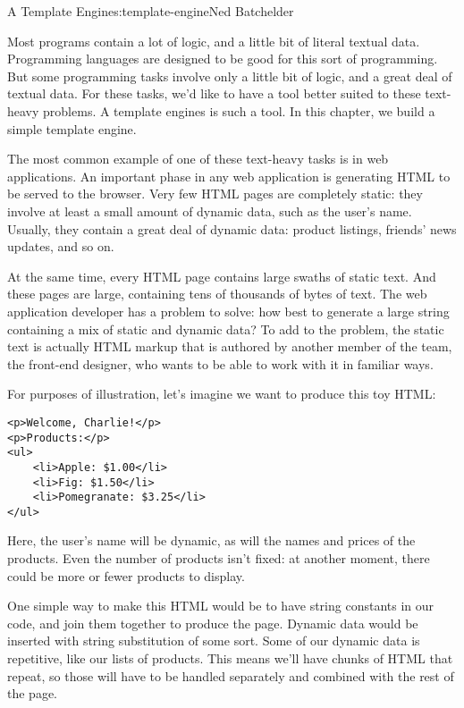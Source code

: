 \begin{aosachapter}{A Template Engine}{s:template-engine}{Ned Batchelder}

Most programs contain a lot of logic, and a little bit of literal
textual data. Programming languages are designed to be good for this
sort of programming. But some programming tasks involve only a little
bit of logic, and a great deal of textual data. For these tasks, we'd
like to have a tool better suited to these text-heavy problems. A
template engines is such a tool. In this chapter, we build a simple
template engine.

The most common example of one of these text-heavy tasks is in web
applications. An important phase in any web application is generating
HTML to be served to the browser. Very few HTML pages are completely
static: they involve at least a small amount of dynamic data, such as
the user's name. Usually, they contain a great deal of dynamic data:
product listings, friends' news updates, and so on.

At the same time, every HTML page contains large swaths of static text.
And these pages are large, containing tens of thousands of bytes of
text. The web application developer has a problem to solve: how best to
generate a large string containing a mix of static and dynamic data? To
add to the problem, the static text is actually HTML markup that is
authored by another member of the team, the front-end designer, who
wants to be able to work with it in familiar ways.

For purposes of illustration, let's imagine we want to produce this toy
HTML:

\begin{verbatim}
<p>Welcome, Charlie!</p>
<p>Products:</p>
<ul>
    <li>Apple: $1.00</li>
    <li>Fig: $1.50</li>
    <li>Pomegranate: $3.25</li>
</ul>
\end{verbatim}

Here, the user's name will be dynamic, as will the names and prices of
the products. Even the number of products isn't fixed: at another
moment, there could be more or fewer products to display.

One simple way to make this HTML would be to have string constants in
our code, and join them together to produce the page. Dynamic data would
be inserted with string substitution of some sort. Some of our dynamic
data is repetitive, like our lists of products. This means we'll have
chunks of HTML that repeat, so those will have to be handled separately
and combined with the rest of the page.


\end{aosachapter}
